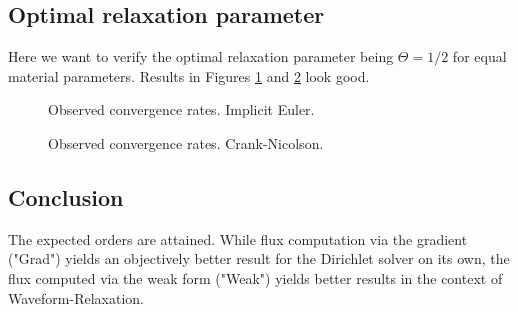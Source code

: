 \documentclass[a4paper,10pt]{article}
\begin{document}
\subsection{Optimal relaxation parameter}
Here we want to verify the optimal relaxation parameter being $\Theta = 1/2$ for equal material parameters. Results in Figures \ref{FIG WR CONV 1} and \ref{FIG WR CONV 2} look good.
% 
\begin{figure}[ht!]
\caption{Observed convergence rates. Implicit Euler.}
\label{FIG WR CONV 1}
\end{figure}
% 
\begin{figure}[ht!]
\caption{Observed convergence rates. Crank-Nicolson.}
\label{FIG WR CONV 2}
\end{figure}
% 
\FloatBarrier
\subsection{Conclusion}
% 
The expected orders are attained. While flux computation via the gradient ("Grad") yields an objectively better result for the Dirichlet solver on its own, the flux computed via the weak form ("Weak") yields better results in the context of Waveform-Relaxation.
\end{document}
